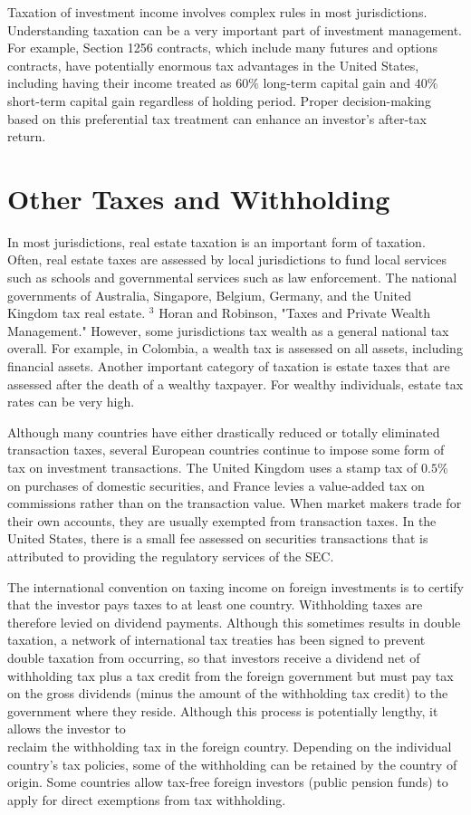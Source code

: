 \documentclass[11pt]{article}
\begin{document}
Taxation of investment income involves complex rules in most jurisdictions. Understanding taxation can be a very important part of investment management. For example, Section 1256 contracts, which include many futures and options contracts, have potentially enormous tax advantages in the United States, including having their income treated as $60 \%$ long-term capital gain and $40 \%$ short-term capital gain regardless of holding period. Proper decision-making based on this preferential tax treatment can enhance an investor's after-tax return.

\section*{Other Taxes and Withholding}
In most jurisdictions, real estate taxation is an important form of taxation. Often, real estate taxes are assessed by local jurisdictions to fund local services such as schools and governmental services such as law enforcement. The national governments of Australia, Singapore, Belgium, Germany, and the United Kingdom tax real estate. ${ }^{3}$ Horan and Robinson, "Taxes and Private Wealth Management." However, some jurisdictions tax wealth as a general national tax overall. For example, in Colombia, a wealth tax is assessed on all assets, including financial assets. Another important category of taxation is estate taxes that are assessed after the death of a wealthy taxpayer. For wealthy individuals, estate tax rates can be very high.

Although many countries have either drastically reduced or totally eliminated transaction taxes, several European countries continue to impose some form of tax on investment transactions. The United Kingdom uses a stamp tax of $0.5 \%$ on purchases of domestic securities, and France levies a value-added tax on commissions rather than on the transaction value. When market makers trade for their own accounts, they are usually exempted from transaction taxes. In the United States, there is a small fee assessed on securities transactions that is attributed to providing the regulatory services of the SEC.

The international convention on taxing income on foreign investments is to certify that the investor pays taxes to at least one country. Withholding taxes are therefore levied on dividend payments. Although this sometimes results in double taxation, a network of international tax treaties has been signed to prevent double taxation from occurring, so that investors receive a dividend net of withholding tax plus a tax credit from the foreign government but must pay tax on the gross dividends (minus the amount of the withholding tax credit) to the government where they reside. Although this process is potentially lengthy, it allows the investor to\\
reclaim the withholding tax in the foreign country. Depending on the individual country's tax policies, some of the withholding can be retained by the country of origin. Some countries allow tax-free foreign investors (public pension funds) to apply for direct exemptions from tax withholding.
\end{document}
